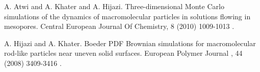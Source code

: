 
\begin{thebibliography}{10}

{\sc A. Atwi and A. Khater and A. Hijazi}. {Three-dimensional Monte Carlo simulations of the dynamics of macromolecular particles in solutions flowing in mesopores}. Central European Journal Of Chemistry, 8 (2010) 1009-1013  .



{\sc A. Hijazi and A. Khater}. {Boeder PDF Brownian simulations for macromolecular rod-like particles near uneven solid surfaces}. European Polymer Journal , 44 (2008) 3409-3416 .

\end{thebibliography}
